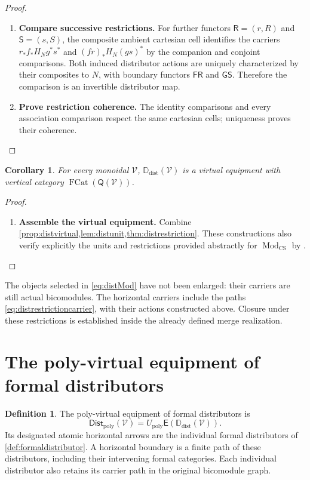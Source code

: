 \documentclass[11pt,reqno]{amsart}
\theoremstyle{plain}
\newtheorem{corollary}[theorem]{Corollary}
\theoremstyle{definition}
\newtheorem{definition}[theorem]{Definition}
\theoremstyle{remark}
\numberwithin{equation}{section}
\newcommand{\V}{\mathcal V}
\newcommand{\E}{\mathsf E}
\newcommand{\Q}{\mathsf Q}
\newcommand{\Ddist}{\mathbb D_{\mathrm{dist}}}
\newcommand{\FDist}{\mathsf{Dist}_{\mathrm{poly}}}
\newcommand{\Up}{U_{\mathrm{poly}}}
\newcommand{\Mod}{\operatorname{Mod}_{\mathrm{CS}}}
\newcommand{\FCat}{\operatorname{FCat}}
\begin{document}
\begin{proof}
\begin{enumerate}
\item \textbf{Compare successive restrictions.} For further functors $\mathsf R=(r,R)$ and $\mathsf S=(s,S)$,
the composite ambient cartesian cell identifies the carriers
$r_*f_*H_Ng^*s^*$ and $(fr)_*H_N(gs)^*$ by the companion and conjoint
comparisons. Both induced distributor actions are uniquely characterized
by their composites to $N$, with boundary functors
$\mathsf F\mathsf R$ and $\mathsf G\mathsf S$. Therefore the
comparison is an invertible distributor map.

\item \textbf{Prove restriction coherence.} The identity comparisons and
every association comparison respect the same cartesian cells; uniqueness
proves their coherence.\qedhere
\end{enumerate}
\end{proof}

\begin{corollary}\label{cor:distequipment}
For every monoidal $\V$, $\Ddist(\V)$ is a virtual equipment with
vertical category $\FCat(\Q(\V))$.
\end{corollary}
\begin{proof}\leavevmode
\begin{enumerate}
\item \textbf{Assemble the virtual equipment.} Combine \cref{prop:distvirtual,lem:distunit,thm:distrestriction}.
These constructions also verify explicitly the units and restrictions
provided abstractly for $\Mod$ by
\cite[Propositions 5.5 and 7.4]{CruttwellShulman2010}.\qedhere
\end{enumerate}
\end{proof}

The objects selected in \cref{eq:distMod} have not been enlarged:
their carriers are still actual bicomodules. The horizontal carriers
include the paths \cref{eq:distrestrictioncarrier}, with their actions
constructed above. Closure under these restrictions is established inside
the already defined merge realization.

\section{The poly-virtual equipment of formal distributors}\label{sec:distributorcompletion}

\begin{definition}\label{def:FDist}
The poly-virtual equipment of formal distributors is
\begin{equation}\label{eq:FDist}
 \FDist(\V)=\Up\E(\Ddist(\V)).
\end{equation}
Its designated atomic horizontal arrows are the individual formal
distributors of \cref{def:formaldistributor}. A horizontal boundary is
a finite path of these distributors, including their intervening formal
categories. Each individual distributor also retains its carrier path
in the original bicomodule graph.
\end{definition}
\end{document}
